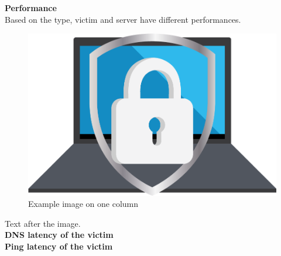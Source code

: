 \textbf{Performance}\\
Based on the type, victim and server have different performances.\\
\begin{figure}[H]
    \centering
    \includegraphics[width=\columnwidth]{Sections/Images/example.png}
    \caption{Example image on one column}
    \label{fig:example}
\end{figure}
\noindent Text after the image.\\
{\bfseries DNS latency of the victim}\\
{\bfseries Ping latency of the victim}\\